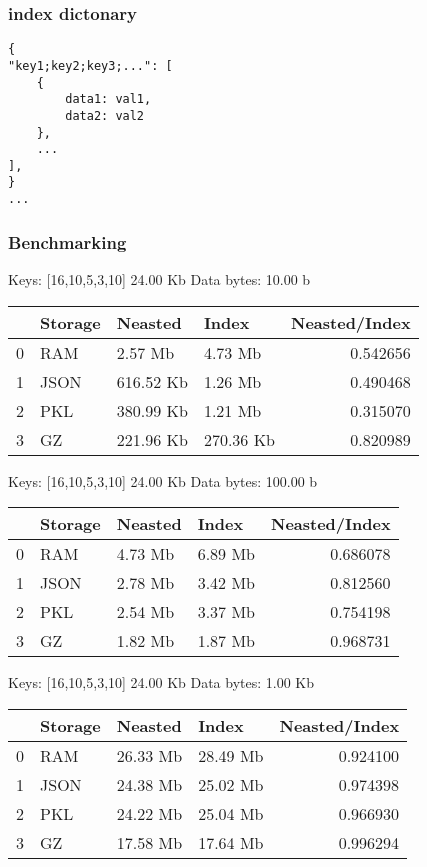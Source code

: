 \subsubsection{index dictonary}
\begin{lstlisting}
{
"key1;key2;key3;...": [
	{
		data1: val1,
		data2: val2
	},
	...
],
}
...
\end{lstlisting}

\subsubsection{Benchmarking}


{\centering

Keys: [16,10,5,3,10] 24.00 Kb  Data bytes: 10.00 b 
	
\begin{tabular}{llllr}
	\toprule
	{} & Storage &    Neasted &      Index &  Neasted/Index \\
	\midrule
	0 &     RAM &    2.57 Mb &    4.73 Mb &       0.542656 \\
	1 &   JSON  &  616.52 Kb &    1.26 Mb &       0.490468 \\
	2 &     PKL &  380.99 Kb &    1.21 Mb &       0.315070 \\
	3 &      GZ &  221.96 Kb &  270.36 Kb &       0.820989 \\
	\bottomrule
\end{tabular}


Keys: [16,10,5,3,10] 24.00 Kb  Data bytes: 100.00 b 

\begin{tabular}{llllr}
	\toprule
	{} & Storage &  Neasted &    Index &  Neasted/Index \\
	\midrule
	0 &     RAM &  4.73 Mb &  6.89 Mb &       0.686078 \\
	1 &   JSON  &  2.78 Mb &  3.42 Mb &       0.812560 \\
	2 &     PKL &  2.54 Mb &  3.37 Mb &       0.754198 \\
	3 &      GZ &  1.82 Mb &  1.87 Mb &       0.968731 \\
	\bottomrule
\end{tabular}


Keys: [16,10,5,3,10] 24.00 Kb  Data bytes: 1.00 Kb 

\begin{tabular}{llllr}
	\toprule
	{} & Storage &   Neasted &     Index &  Neasted/Index \\
	\midrule
	0 &     RAM &  26.33 Mb &  28.49 Mb &       0.924100 \\
	1 &   JSON  &  24.38 Mb &  25.02 Mb &       0.974398 \\
	2 &     PKL &  24.22 Mb &  25.04 Mb &       0.966930 \\
	3 &      GZ &  17.58 Mb &  17.64 Mb &       0.996294 \\
	\bottomrule
\end{tabular}


}
